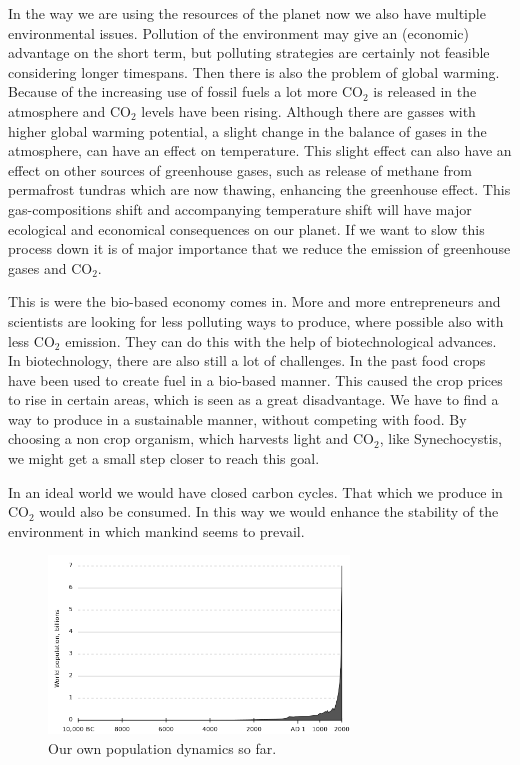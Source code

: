 \documentclass[10pt]{report}
\begin{document}
In the way we are using the resources of the planet now we also have multiple 
environmental issues. Pollution of the environment may give an (economic) 
advantage on the short term, but polluting strategies are certainly not feasible 
considering longer timespans. 
Then there is also the problem of global warming. Because of the increasing use 
of fossil fuels a lot more CO$_{2}$ is released in the atmosphere and CO$_{2}$ 
levels have been rising. Although there are gasses with higher global warming 
potential, a slight change in the balance of gases in the atmosphere, can have 
an effect on temperature. This slight effect can also have an effect on other 
sources of greenhouse gases, such as release of methane from permafrost tundras 
which are now thawing, enhancing the greenhouse effect. This gas-compositions 
shift and accompanying temperature shift will have major ecological and 
economical consequences on our planet. If we want to slow this process down it 
is of major importance that we reduce the emission of greenhouse gases and 
CO$_2$.

This is were the bio-based economy comes in. More and more entrepreneurs and 
scientists are looking for less polluting ways to produce, where possible also 
with less CO$_2$ emission. They can do this with the help of biotechnological 
advances. In biotechnology, there are also still a lot of challenges. In the 
past food crops have been used to create fuel in a bio-based manner. This caused 
the crop prices to rise in certain areas, which is seen as a great disadvantage. 
We have to find a way to produce in a sustainable manner, without competing with 
food. By choosing a non crop organism, which harvests light and CO$_2$, like 
Synechocystis, we might get a small step closer to reach this goal. 

In an ideal world we would have closed carbon cycles. That which we produce in 
CO$_2$ would also be consumed. In this way we would enhance the stability of the 
environment in which mankind seems to prevail. 

\begin{figure}[!ht]
 \begin{center}  
  \includegraphics[width=8cm]{human_population_curve.png}
  \caption{Our own population dynamics so far.}
  \label{fig:owndyn}
 \end{center}
\end{figure}
\end{document}
